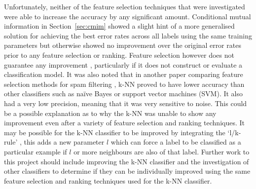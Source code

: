 Unfortunately, neither of the feature selection techniques that were investigated were able to increase the accuracy by any
significant amount. Conditional mutual information in Section~\ref{sec:cmim} showed a slight hint of a more generalised solution
for achieving the best error rates across all labels using the same training parameters but otherwise showed no improvement
over the original error rates prior to any feature selection or ranking. Feature selection however does not guarantee any
improvement \cite{stability_feature_ranking}, particularly if it does not construct or evaluate a classification model. It was
also noted that in another paper comparing feature selection methods for spam filtering \cite{mlmethods_spamfiltering}, k-NN
proved to have lower accuracy than other classifiers such as na\"{i}ve Bayes or support vector machines (SVM). It also had a
very low precision, meaning that it was very sensitive to noise. This could be a possible explanation as to why the k-NN was
unable to show any improvement even after a variety of feature selection and ranking techniques. It may be possible for the k-NN
classifier to be improved by integrating the `l/k-rule' \cite{mlmethods_spamfiltering}, this adds a new parameter $l$ which can 
force a label to be classified as a particular example if $l$ or more neighbours are also of that label. Further work to this
project should include improving the k-NN classifier and the investigation of other classifiers to determine if they can be
individually improved using the same feature selection and ranking techniques used for the k-NN classifier.

% 
% 
% 
% 
% 